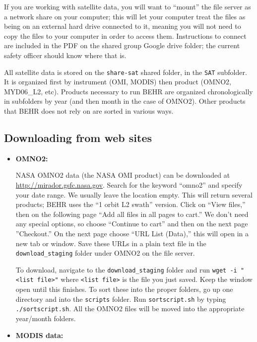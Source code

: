 \documentclass[12pt]{article}
\begin{document}
		If you are working with satellite data, you will want to ``mount'' the file server as a network share on your computer; this will let your computer treat the files as being on an external hard drive connected to it, meaning you will not need to copy the files to your computer in order to access them.  Instructions to connect are included in the PDF on the shared group Google drive folder; the current safety officer should know where that is.
		
		All satellite data is stored on the \texttt{share-sat} shared folder, in the \texttt{SAT} subfolder. It is organized first by instrument (OMI, MODIS) then product (OMNO2, MYD06\_L2, etc). Products necessary to run BEHR are organized chronologically in subfolders by year (and then month in the case of OMNO2). Other products that BEHR does not rely on are sorted in various ways.
	
	\subsection{Downloading from web sites}
	
	\begin{itemize}
	
	\item \textbf{OMNO2:}
	
		NASA OMNO2 data (the NASA OMI  product) can be downloaded at \url{http://mirador.gsfc.nasa.gov}. Search for the keyword ``omno2'' and specify your date range. We usually leave the location empty. This will return several products; BEHR uses the ``1 orbit L2 swath'' version. Click on ``View files,'' then on the following page ``Add all files in all pages to cart.''  We don't need any special options, so choose ``Continue to cart'' and then on the next page ''Checkout.'' On the next page choose ``URL List (Data),'' this will open in a new tab or window. Save these URLs in a plain text file in the \texttt{download\_staging} folder under OMNO2 on the file server. 
		
		To download, navigate to the \texttt{download\_staging} folder and run \texttt{wget -i "<list file>"} where \texttt{<list file>} is the file you just saved. Keep the window open until this finishes. To sort these into the proper folders, go up one directory and into the \texttt{scripts} folder. Run \texttt{sortscript.sh} by typing \texttt{./sortscript.sh}. All the OMNO2 files will be moved into the appropriate year/month folders.
	
	\item \textbf{MODIS data:}
	
		
	\end{itemize}
\end{document}
